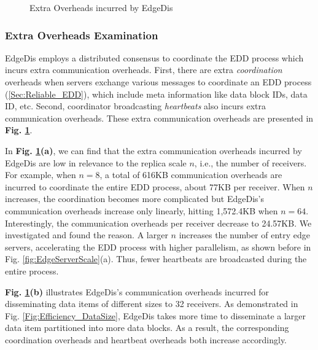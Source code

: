 \documentclass[10pt,journal,compsoc]{IEEEtran}
\begin{document}
\begin{figure}
    \centering
    \vspace{-1em}
    \caption{Extra Overheads incurred by EdgeDis}
    \label{fig:System_Overheads}
\end{figure}

%
\subsubsection{Extra Overheads Examination} 
\label{subsubsec:systemOverhead}
EdgeDis employs a distributed consensus to coordinate the EDD process which incurs extra communication overheads. First, there are extra \textit{coordination} overheads when servers exchange various messages to coordinate an EDD process (\cref{Sec:Reliable_EDD}), which include meta information like data block IDs, data ID, etc. Second, coordinator broadcasting \textit{heartbeats} also incurs extra communication overheads. These extra communication overheads are presented in \textbf{Fig. \ref{fig:System_Overheads}}.



In \textbf{Fig. \ref{fig:System_Overheads}(a)}, we can find that the extra communication overheads incurred by EdgeDis are low in relevance to the replica scale $n$, i.e., the number of receivers. For example, when $n = 8$, a total of 616KB communication overheads are incurred to coordinate the entire EDD process, about 77KB per receiver. When $n$ increases, the coordination becomes more complicated but EdgeDis's communication overheads increase only linearly, hitting 1,572.4KB when $n=64$. Interestingly, the communication overheads per receiver decrease to 24.57KB. We investigated and found the reason. A larger $n$ increases the number of entry edge servers, accelerating the EDD process with higher parallelism, as shown before in Fig. \ref{fig:EdgeServerScale}(a). Thus, fewer heartbeats are broadcasted during the entire process.

\textbf{Fig. \ref{fig:System_Overheads}(b)} illustrates EdgeDis's communication overheads incurred for disseminating data items of different sizes to 32 receivers. As demonstrated in Fig. \ref{Fig:Efficiency_DataSize}, EdgeDis takes more time to disseminate a larger data item partitioned into more data blocks. As a result, the corresponding coordination overheads and heartbeat overheads both increase accordingly.
\end{document}
